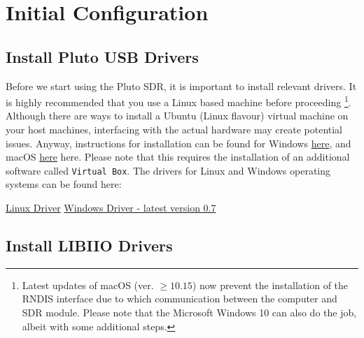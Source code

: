 \documentclass[11pt]{article}
\begin{document}
\section{Initial Configuration}


\subsection{Install Pluto USB Drivers}
Before we start using the Pluto SDR, it is important to install relevant drivers. It is highly recommended that you use a Linux based machine before proceeding \footnote[1]{Latest updates of macOS (ver. $\ge 10.15$) now prevent the installation of the RNDIS interface due to which communication between the computer and SDR module. Please note that the Microsoft Windows 10 can also do the job, albeit with some additional steps.}. Although there are ways to install a Ubuntu (Linux flavour) virtual machine on your host machines, interfacing with the actual hardware may create potential issues. Anyway, instructions for installation  can be found for Windows \href{https://www.wikihow.com/Install-Ubuntu-on-VirtualBox}{here}, and macOS \href{https://codingwithmanny.medium.com/installing-ubuntu-18-04-on-mac-os-with-virtualbox-ac3b39678602}{here} here. Please note that this requires the installation of an additional software called \texttt{Virtual Box}. The drivers for Linux and Windows operating systems can be found here:
\begin{outline}
  \1 \href{https://wiki.analog.com/_media/university/tools/pluto/drivers/plutosdr-m2k-udev_1.0_amd64.deb}{Linux Driver}
  \1 \href{https://wiki.analog.com/university/tools/pluto/drivers/windows}{Windows Driver - latest version 0.7}
\end{outline}

\subsection{Install LIBIIO Drivers}
\end{document}
